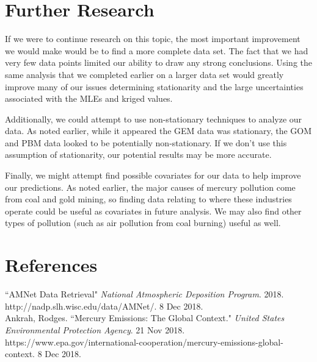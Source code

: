 \documentclass[12pt,a4]{article}
\theoremstyle{plain} %
\begin{document}
\section{Further Research}
If we were to continue research on this topic, the most important improvement we would make would be to find a more complete data set. The fact that we had very few data points limited our ability to draw any strong conclusions. Using the same analysis that we completed earlier on a larger data set would greatly improve many of our issues determining stationarity and the large uncertainties associated with the MLEs and kriged values.

Additionally, we could attempt to use non-stationary techniques to analyze our data. As noted earlier, while it appeared the GEM data was stationary, the GOM and PBM data looked to be potentially non-stationary. If we don't use this assumption of stationarity, our potential results may be more accurate.

Finally, we might attempt find possible covariates for our data to help improve our predictions. As noted earlier, the major causes of mercury pollution come from coal and gold mining, so finding data relating to where these industries operate could be useful as covariates in future analysis. We may also find other types of pollution (such as air pollution from coal burning) useful as well.

\newpage

\section{References}
\begin{hangparas}{.25in}{1}
    ``AMNet Data Retrieval" \textit{National Atmospheric Deposition Program}. 2018.\\ http://nadp.slh.wisc.edu/data/AMNet/. 8 Dec 2018. \\
    
    Ankrah, Rodges. ``Mercury Emissions: The Global Context." \textit{United States Environmental Protection Agency}. 21 Nov 2018. https://www.epa.gov/international-cooperation/mercury-emissions-global-context. 8 Dec 2018.
\end{hangparas}
\end{document}
